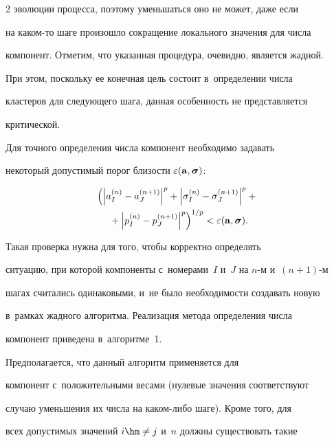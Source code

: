 \begin{multicols}{2}
 эволюции процесса, поэтому уменьшаться оно не может, даже если 

 на ка\-ком-то шаге произошло сокращение локального значения для чис\-ла 

 компонент. Отметим, что указанная процедура, очевидно, является жад\-ной.

  При этом, поскольку ее конечная цель со\-сто\-ит в~определении чис\-ла 

  клас\-те\-ров для сле\-ду\-юще\-го шага, данная особенность не пред\-став\-ля\-ет\-ся 

  критической.



Для точного определения чис\-ла компонент необходимо задавать 

некоторый допустимый порог бли\-зости $\varepsilon({\bf a}, 

{\boldsymbol \sigma})$:

\begin{multline}

\label{Dist}

\left(\left|a_I^{(n)}-a_J^{(n+1)}\right|^p+

\left|\sigma_I^{(n)}-\sigma_J^{(n+1)}\right|^p +{}\right.\\

\left.{}+\left|p_I^{(n)}-

p_J^{(n+1)}\right|^p\right)^{1/p} < \varepsilon({\bf a}, 

{\boldsymbol \sigma}).

\end{multline}



Такая проверка нужна для того, чтобы корректно определять 

ситуацию, при которой компоненты с~номерами~$I$ и~$J$ на $n$-м и~$(n+1)$-м 

шагах считались одинаковыми, и~не было не\-об\-хо\-ди\-мости создавать новую 

в~рамках жад\-но\-го алгоритма. Реализация метода определения чис\-ла 

компонент приведена в~алгоритме~1.



Предполагается, что данный алгоритм применяется для 

компонент с~положительными весами (нулевые значения соответствуют 

случаю уменьшения их чис\-ла на ка\-ком-ли\-бо шаге). Кроме того, для 

всех допустимых значений $i\hm\neq j$ и~$n$ должны существовать такие 


\end{multicols}
